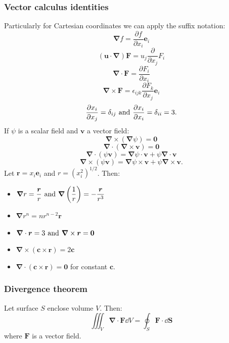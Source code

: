 \documentclass{article}
\newcommand{\vc}[1]{\boldsymbol{#1}}
\begin{document}
\begin{multicols*}{3}
\subsubsection*{Vector calculus identities}
Particularly for Cartesian coordinates
we can apply the suffix notation:
$$\vc{\nabla}f=
\frac{\partial f}{\partial x_i}\vc{e}_i$$
$$(\vc{u}\cdot\vc{\nabla})\vc{F}
=u_j\frac{\partial}{\partial x_j}F_i$$
$$\vc{\nabla}\cdot\vc{F}=
\frac{\partial F_i}{\partial x_i}$$
$$\vc{\nabla}\times\vc{F}
=\epsilon_{ijk}\frac{\partial F_k}{\partial x_j}
\vc{e}_i$$
$$\frac{\partial x_i}{\partial x_j}=\delta_{ij}
\hspace{0.05in}\text{and}\hspace{0.05in}
\frac{\partial x_i}{\partial x_i}=\delta_{ii}=3.$$
If $\psi$ is a scalar field and $\vc{v}$ a vector field:
$$\vc{\nabla}\times(\vc{\nabla}\psi)=\vc{0}$$
$$\vc{\nabla}\cdot(\vc{\nabla}\times\vc{v})=\vc{0}$$
$$\vc{\nabla}\cdot(\psi\vc{v})
=\vc{\nabla}\psi\cdot\vc{v}+\psi\vc{\nabla}\cdot\vc{v}$$
$$\vc{\nabla}\times(\psi\vc{v})
=\vc{\nabla}\psi\times\vc{v}+\psi\vc{\nabla}\times\vc{v}.$$
Let $\vc{r}=x_i\vc{e}_i$ and $r=(x_i^2)^{1/2}$. Then:
\begin{itemize}
    \item $\displaystyle\vc{\nabla}r=\frac{\vc{r}}{r}
    \hspace{0.05in}\text{and}\hspace{0.05in}
    \vc{\nabla}\left(\frac{1}{r}\right)
    =-\frac{\vc{r}}{r^3}$
    
    \item $\displaystyle\vc{\nabla}r^n
    =n r^{n-2}\vc{r}$
    
    \item $\displaystyle\vc{\nabla}\cdot\vc{r}=3
    \hspace{0.05in}\text{and}\hspace{0.05in}
    \vc{\nabla}\times\vc{r}=\vc{0}$

    \item $\displaystyle\vc{\nabla}\times
    (\vc{c}\times\vc{r})=2\vc{c}$
    
    \item $\displaystyle\vc{\nabla}
    \cdot(\vc{c}\times\vc{r})=\vc{0}$
    for constant $\vc{c}$.
\end{itemize}

\subsubsection*{Divergence theorem}
Let surface $S$ enclose volume $V$. Then:
$$\iiint_V \vc{\nabla}\cdot\vc{F}\dd V
=\oint_S \vc{F}\cdot\dd\vc{S}$$
where $\vc{F}$ is a vector field.


\end{multicols*}
\end{document}
